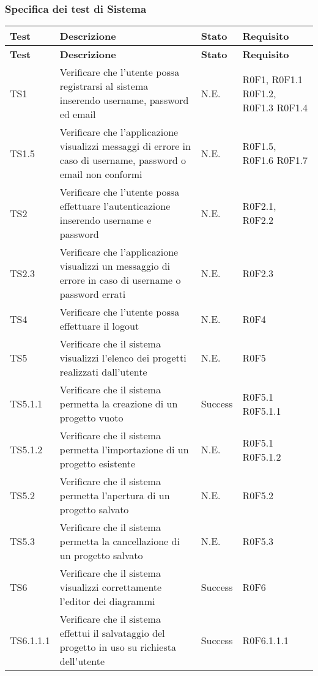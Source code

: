 \subsubsection{Specifica dei test di Sistema}
\begin{longtable}{p{2.5cm}!{\VRule[1pt]}p{6cm}!{\VRule[1pt]}p{1.5cm}!{\VRule[1pt]}p{3cm}}
\color{white} \textbf{Test} & \color{white} \textbf{Descrizione}  & \color{white} \textbf{Stato}  & \color{white} \textbf{Requisito}\\ 
\endfirsthead 
{} 
\color{white} \textbf{Test} & \color{white} \textbf{Descrizione}  & \color{white} \textbf{Stato}  & \color{white} \textbf{Requisito}\\  
\endhead 
TS1 & Verificare che l'utente possa registrarsi al sistema inserendo username, password ed email  & N.E. & R0F1, R0F1.1\newline
R0F1.2, R0F1.3\newline
R0F1.4\\
TS1.5 & Verificare che l'applicazione visualizzi messaggi di errore in caso di username, password o email non conformi & N.E. & R0F1.5, R0F1.6 \newline
R0F1.7\\
TS2 & Verificare che l'utente possa effettuare l'autenticazione inserendo username e password & N.E. & R0F2.1, R0F2.2\\
TS2.3 & Verificare che l'applicazione visualizzi un messaggio di errore in caso di username o password errati & N.E. & R0F2.3\\
TS4 & Verificare che l'utente possa effettuare il logout & N.E. & R0F4\\
TS5 & Verificare che il sistema visualizzi l'elenco dei progetti realizzati dall'utente & N.E. & R0F5 \\
TS5.1.1 & Verificare che il sistema permetta la creazione di un progetto vuoto & Success & R0F5.1 R0F5.1.1\\
TS5.1.2 & Verificare che il sistema permetta l'importazione di un progetto esistente & N.E. & R0F5.1 R0F5.1.2\\
TS5.2 & Verificare che il sistema permetta l'apertura di un progetto salvato & N.E. & R0F5.2\\
TS5.3 & Verificare che il sistema permetta la cancellazione di un progetto salvato & N.E. & R0F5.3\\
TS6 & Verificare che il sistema visualizzi correttamente l'editor dei diagrammi & Success & R0F6\\
TS6.1.1.1 & Verificare che il sistema effettui il salvataggio del progetto in uso su richiesta dell'utente & Success & R0F6.1.1.1\\

\end{longtable}
